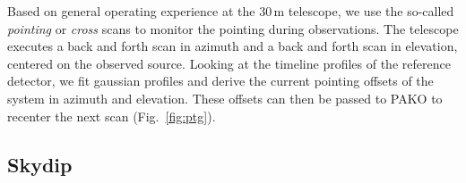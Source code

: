 
Based on general operating experience at the 30\,m telescope, we use the so-called
{\em pointing} or {\em cross} scans to monitor the pointing during observations. The
telescope executes a back and forth scan in azimuth and a back and forth scan in
elevation, centered on the observed source. Looking at the timeline profiles of
the reference detector, we fit gaussian profiles and derive the current pointing
offsets of the system in azimuth and elevation. These offsets can then be passed
to PAKO to recenter the next scan (Fig.~\ref{fig:ptg}).




\subsection{Skydip}
\label{se:skydip}

